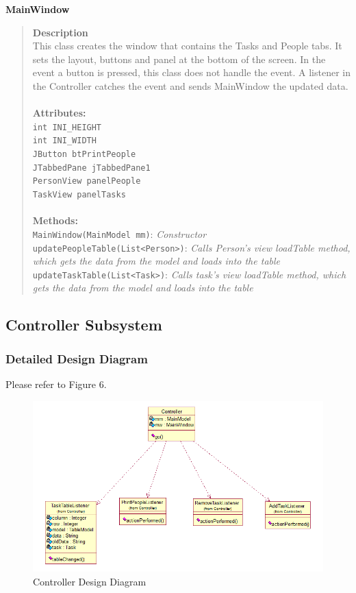\documentclass[12pt]{article}
\begin{document}
{\bf MainWindow}
\begin{quote}
{\bf Description}\\
This class creates the window that contains the Tasks and People tabs.  It sets the layout, buttons and panel at the bottom of the screen. In the event a button is pressed, this class does not handle the event.  A listener in the Controller catches the event and sends MainWindow the updated data.\\\\
{\bf Attributes:}\\
\texttt{int INI\_HEIGHT}\\
\texttt{int INI\_WIDTH}\\
\texttt{JButton btPrintPeople}\\
\texttt{JTabbedPane jTabbedPane1}\\
\texttt{PersonView panelPeople}\\
\texttt{TaskView panelTasks}\\\\
{\bf Methods:}\\
\texttt{MainWindow(MainModel mm)}:  \emph{Constructor}\\
\texttt{updatePeopleTable(List<Person>)}:  \emph{Calls Person's view loadTable method, which gets the data from the model and loads into the table}\\
\texttt{updateTaskTable(List<Task>)}: \emph{Calls task's view loadTable method, which gets the data from the model and loads into the table}
\end{quote}

\subsection{Controller Subsystem}

\subsubsection{Detailed Design Diagram}

Please refer to Figure 6.

\begin{figure}[htbp]
\begin{center} \includegraphics[scale=.55]{Diagrams/controller_diagram.png} \end{center}
\caption{Controller Design Diagram}
\label{fig:model-diagram}
\end{figure}
\end{document}
